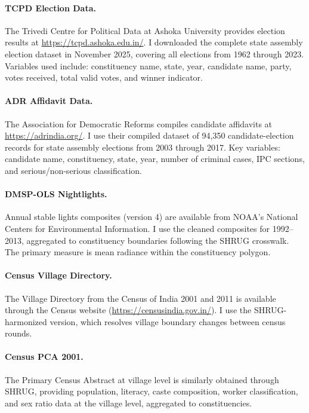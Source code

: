 \documentclass[12pt]{article}
\begin{document}
\paragraph{TCPD Election Data.} The Trivedi Centre for Political Data at Ashoka University provides election results at \url{https://tcpd.ashoka.edu.in/}. I downloaded the complete state assembly election dataset in November 2025, covering all elections from 1962 through 2023. Variables used include: constituency name, state, year, candidate name, party, votes received, total valid votes, and winner indicator.

\paragraph{ADR Affidavit Data.} The Association for Democratic Reforms compiles candidate affidavits at \url{https://adrindia.org/}. I use their compiled dataset of 94,350 candidate-election records for state assembly elections from 2003 through 2017. Key variables: candidate name, constituency, state, year, number of criminal cases, IPC sections, and serious/non-serious classification.

\paragraph{DMSP-OLS Nightlights.} Annual stable lights composites (version 4) are available from NOAA's National Centers for Environmental Information. I use the cleaned composites for 1992--2013, aggregated to constituency boundaries following the SHRUG crosswalk. The primary measure is mean radiance within the constituency polygon.

\paragraph{Census Village Directory.} The Village Directory from the Census of India 2001 and 2011 is available through the Census website (\url{https://censusindia.gov.in/}). I use the SHRUG-harmonized version, which resolves village boundary changes between census rounds.

\paragraph{Census PCA 2001.} The Primary Census Abstract at village level is similarly obtained through SHRUG, providing population, literacy, caste composition, worker classification, and sex ratio data at the village level, aggregated to constituencies.
\end{document}
